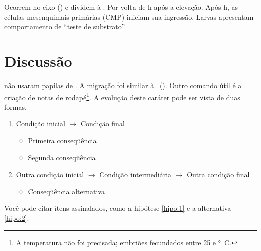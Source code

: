 Ocorrem no eixo  () e dividem à .
Por volta de \unit[7,5]{h} após a elevação.
Após \unit[10]{h}, as células mesenquimais primárias (CMP) iniciam sua ingressão.%
Larvas apresentam comportamento de ``teste de substrato''.

\section{Discussão}\label{cap2:disc}

\citet{Day2006} não usaram papilas de \subsus.
A migração foi similar à \subsus\ ().
Outro comando útil é a criação de notas de rodapé\footnote{A temperatura não foi precisada; embriões fecundados entre 25 e \unit[28]{°C}.}.
A evolução deste caráter pode ser vista de duas formas.

\begin{enumerate}
  \item{Condição inicial $\longrightarrow$ Condição final}\label{hipo:1}
    \begin{itemize}
      \item{Primeira conseqüência}
      \item{Segunda conseqüência}
    \end{itemize}
  \item{Outra condição inicial $\longrightarrow$ Condição intermediária $\longrightarrow$ Outra condição final}\label{hipo:2}
    \begin{itemize}
      \item{Conseqüência alternativa}
    \end{itemize}
\end{enumerate}

Você pode citar ítens assinalados, como a hipótese \ref{hipo:1} e a alternativa \ref{hipo:2}.

